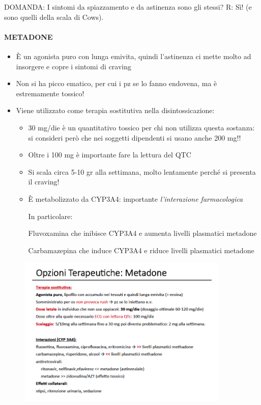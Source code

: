 DOMANDA: I sintomi da spiazzamento e da astinenza sono gli stessi? R:
Sì! (e sono quelli della scala di Cows).

\paragraph{METADONE}

\begin{itemize}
\item
  È un agonista puro con lunga emivita, quindi l'astinenza ci mette
  molto ad insorgere e copre i sintomi di craving
\item
  Non si ha picco ematico, per cui i pz se lo fanno endovena, ma è
  estremamente tossico!
\item
  Viene utilizzato come terapia sostitutiva nella disintossicazione:
  \begin{itemize}
  \item
    30 mg/die è un quantitativo tossico per chi non utilizza questa
    sostanza: si consideri però che nei soggetti dipendenti si usano
    anche 200 mg!!
  \item
    Oltre i 100 mg è importante fare la lettura del QTC
  \item
    Si scala circa 5-10 gr alla settimana, molto lentamente perché si
    presenta il craving!
  \item
    È metabolizzato da CYP3A4: importante \emph{l'interazione
    farmacologica}
  
In particolare:

Fluvoxamina che inibisce CYP3A4 e aumenta livelli plasmatici metadone

Carbamazepina che induce CYP3A4 e riduce livelli plasmatici metadone
\end{itemize}
\end{itemize}

\begin{figure}[!ht]
\centering
	\includegraphics[width=0.9\textwidth]{017/image14.png}
\end{figure}

